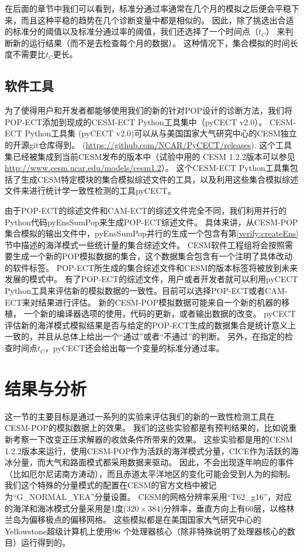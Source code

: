 在后面的章节中我们可以看到，标准分通过率通常在几个月的模拟之后便会平稳下来，而且这种平稳的趋势在几个诊断变量中都是相似的。 
因此，除了挑选出合适的标准分的阈值以及标准分通过率的阈值，我们还选择了一个时间点（$t_C$）
来判断新的运行结果（而不是去检查每个月的数据）。 
这种情况下，集合模拟的时间长度不需要比$t_C$更长。 

\subsection{软件工具}
\label{verify:ECTsoft}

为了使得用户和开发者都能够使用我们的新的针对POP设计的诊断方法，我们将POP-ECT添加到现成的CESM-ECT Python工具集中（pyCECT v2.0）。
CESM-ECT Python工具集 (pyCECT v2.0)可以从与美国国家大气研究中心的CESM独立的开源git仓库得到。 (\url{https://github.com/NCAR/PyCECT/releases}). 
这个工具集已经被集成到当前CESM发布的版本中（试验中用的 CESM 1.2.2版本可以参见\url{http://www.cesm.ucar.edu/models/cesm1.2}）。
这个CESM-ECT Python工具集包括了生成CESM特定模块的集合模拟综述文件的工具，以及利用这些集合模拟综述文件来进行统计学一致性检测的工具pyCECT。

由于POP-ECT的综述文件和CAM-ECT的综述文件完全不同，我们利用并行的Python代码pyEnsSumPop来生成POP-ECT综述文件。
具体来讲，从CESM-POP集合模拟的输出文件中，pyEnsSumPop并行的生成一个包含有第\ref{verify:createEns}节中描述的海洋模式一些统计量的集合综述文件。 
CESM软件工程组将会按照需要生成一个新的POP模拟数据的集合，这个数据集合包含有一个注明了具体改动的软件标签。
POP-ECT所生成的集合综述文件和CESM的版本标签将被放到未来发展的模式中。 
有了POP-ECT的综述文件，用户或者开发者就可以利用pyCECT Python工具来评估新的模拟数据的一致性。目前可以选择POP-ECT或者CAM-ECT来对结果进行评估。
新的CESM-POP模拟数据可能来自一个新的机器的移植， 一个新的编译器选项的使用，代码的更新，或者输出数据的改变。
pyCECT评估新的海洋模式模拟结果是否与给定的POP-ECT生成的数据集合是统计意义上一致的，并且从总体上给出一个“通过”或者“不通过”的判断。
另外，在指定的检查时间点$t_C$，pyCECT还会给出每一个变量的标准分通过率。 

\section{结果与分析} \label{verify:exp}

 
这一节的主要目标是通过一系列的实验来评估我们的新的一致性检测工具在CESM-POP的模拟数据上的效果。
我们的这些实验都是有预判结果的，比如说重新考察一下改变正压求解器的收敛条件所带来的效果。
这些实验都是用的CESM 1.2.2版本来运行，使用CESM-POP作为活跃的海洋模式分量，CICE作为活跃的海冰分量，而大气和路面模式都采用数据来驱动。
因此，不会出现逐年响应的事件（比如厄尔尼诺南方涛动），而且赤道太平洋地区的变化可能会受到人为的抑制。
我们这个特殊的分量模式的配置在CESM的官方文档中被记为“G\_NORMAL\_YEA”分量设置。
CESM的网格分辨率采用“T62\_g16”，对应的海洋和海冰模式分量采用是1度($320 \times 384$)分辨率，垂直方向上有60层，以格林兰岛为偏移极点的偏移网格。 
这些模拟都是在美国国家大气研究中心的Yellowstone超级计算机上使用$96$ 个处理器核心（除非特殊说明了处理器核心的数目）运行得到的。 

